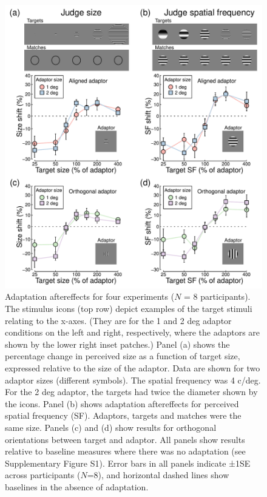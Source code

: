 \documentclass[
]{article}
\begin{document}
\begin{figure}
\centering
\includegraphics{Figures/Figure3.pdf}
\caption{\label{fig:figure3}Adaptation aftereffects for four experiments (\(N\) = 8 participants). The stimulus icons (top row) depict examples of the target stimuli relating to the x-axes. (They are for the 1 and 2 deg adaptor conditions on the left and right, respectively, where the adaptors are shown by the lower right inset patches.) Panel (a) shows the percentage change in perceived size as a function of target size, expressed relative to the size of the adaptor. Data are shown for two adaptor sizes (different symbols). The spatial frequency was 4 c/deg. For the 2 deg adaptor, the targets had twice the diameter shown by the icons. Panel (b) shows adaptation aftereffects for perceived spatial frequency (SF). Adaptors, targets and matches were the same size. Panels (c) and (d) show results for orthogonal orientations between target and adaptor. All panels show results relative to baseline measures where there was no adaptation (see Supplementary Figure S1). Error bars in all panels indicate ±1SE across participants (\(N\)=8), and horizontal dashed lines show baselines in the absence of adaptation.}
\end{figure}
\end{document}
